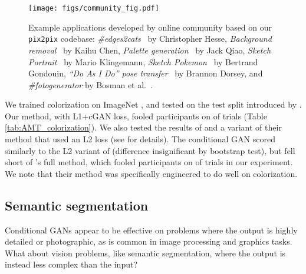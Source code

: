 \documentclass[10pt,twocolumn,letterpaper]{article}
\begin{document}
\begin{figure*}[h]
    \centering
    \texttt{[image: figs/community\_fig.pdf]}
    \vspace{-0.3in}
    \caption{Example applications developed by online community based on our {\tt pix2pix} codebase: \emph{\#edges2cats}~\cite{edges2cats} by Christopher Hesse, \emph{Background removal}~\cite{background} by Kaihu Chen, \emph{Palette generation}~\cite{palette} by Jack Qiao, \emph{Sketch  Portrait}~\cite{sketch2portrait} by Mario Klingemann, \emph{Sketch Pokemon}~\cite{sketch2pokemon} by Bertrand Gondouin, \emph{``Do As I Do'' pose transfer}~\cite{pose} by Brannon Dorsey, and \emph{\#fotogenerator} by Bosman et al.~\cite{fotogenerator}.}
    \label{twitter}
    \vspace{-0.2in}
\end{figure*}



We trained colorization on ImageNet \cite{russakovsky2015imagenet}, and tested on the test split introduced by \cite{zhang2016colorful, larsson2016learning}. Our method, with L1+cGAN loss, fooled participants on  of trials (Table \ref{tab:AMT_colorization}). We also tested the results of \cite{zhang2016colorful} and a variant of their method that used an L2 loss (see \cite{zhang2016colorful} for details). The conditional GAN scored similarly to the L2 variant of \cite{zhang2016colorful} (difference insignificant by bootstrap test), but fell short of \cite{zhang2016colorful}'s full method, which fooled participants on  of trials in our experiment. We note that their method was specifically engineered to do well on colorization.



\subsection{Semantic segmentation}
Conditional GANs appear to be effective on problems where the output is highly detailed or photographic, as is common in image processing and graphics tasks. What about vision problems, like semantic segmentation, where the output is instead less complex than the input?
\end{document}

